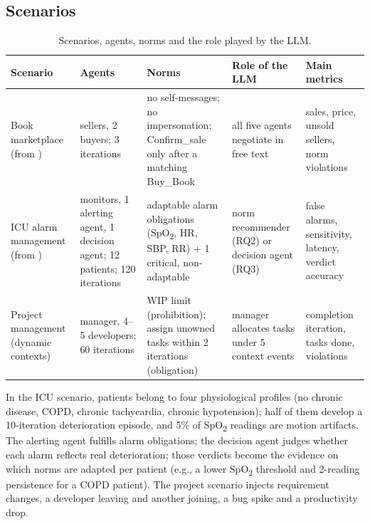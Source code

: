 \documentclass{ieeeaccess}
\begin{document}
\subsection{Scenarios}\label{sec:3.3}
\begin{table}[!t]
\centering
\caption{Scenarios, agents, norms and the role played by the LLM.}
\label{tab:1}
\footnotesize
\setlength{\tabcolsep}{0.06cm}
\renewcommand{\arraystretch}{1.15}
\begin{tabular}{@{}>{\raggedright\arraybackslash}p{}>{\raggedright\arraybackslash}p{}>{\raggedright\arraybackslash}p{}>{\raggedright\arraybackslash}p{}>{\raggedright\arraybackslash}p{}@{}}
\hline
\textbf{Scenario} & \textbf{Agents} & \textbf{Norms} & \textbf{Role of the LLM} & \textbf{Main metrics} \\ \hline
Book marketplace (from \cite{nascimento2023selfadaptive}) & 3 sellers, 2 buyers; 3 iterations & no self-messages; no impersonation; Confirm\_sale only after a matching Buy\_Book & all five agents negotiate in free text & sales, price, unsold sellers, norm violations \\
ICU alarm management (from \cite{viana2025anaml2}) & 2 monitors, 1 alerting agent, 1 decision agent; 12 patients; 120 iterations & 4 adaptable alarm obligations (SpO\textsubscript{2}, HR, SBP, RR) + 1 critical, non-adaptable & norm recommender (RQ2) or decision agent (RQ3) & false alarms, sensitivity, latency, verdict accuracy \\
Project management (dynamic contexts) & 1 manager, 4–5 developers; 60 iterations & WIP limit (prohibition); assign unowned tasks within 2 iterations (obligation) & manager allocates tasks under 5 context events & completion iteration, tasks done, violations \\ \hline
\end{tabular}
\end{table}

In the ICU scenario, patients belong to four physiological profiles (no chronic disease, COPD, chronic tachycardia, chronic hypotension); half of them develop a 10-iteration deterioration episode, and 5\% of SpO\textsubscript{2} readings are motion artifacts. The alerting agent fulfills alarm obligations; the decision agent judges whether each alarm reflects real deterioration; those verdicts become the evidence on which norms are adapted per patient (e.g., a lower SpO\textsubscript{2} threshold and 2-reading persistence for a COPD patient). The project scenario injects requirement changes, a developer leaving and another joining, a bug spike and a productivity drop.
\end{document}
